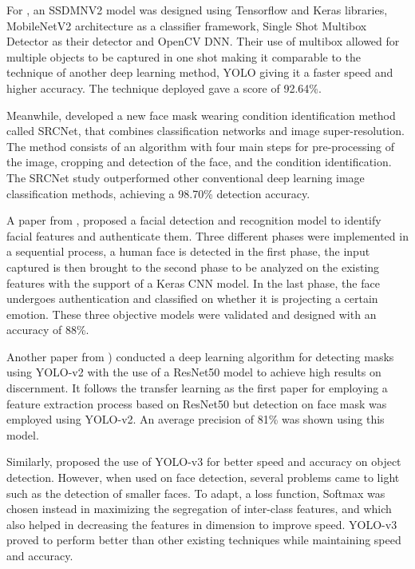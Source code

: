 \documentclass[a4paper,12pt]{article}
\begin{document}
For \cite{nagrath2021ssdmnv2}, an SSDMNV2 model was designed using Tensorflow and Keras libraries, MobileNetV2 architecture as a classifier framework, Single Shot Multibox Detector as their detector and OpenCV DNN. Their use of multibox allowed for multiple objects to be captured in one shot making it comparable to the technique of another deep learning method, YOLO giving it a faster speed and higher accuracy. The technique deployed gave a score of 92.64\%.

Meanwhile, \cite{qin2020identifying} developed a new face mask wearing condition identification method called SRCNet, that combines classification networks and image super-resolution. The method consists of an algorithm with four main steps for pre-processing of the image, cropping and detection of the face, and the condition identification. The SRCNet study outperformed other conventional deep learning image classification methods, achieving a 98.70\% detection accuracy.

A paper from \cite{hussain2020real}, proposed a facial detection and recognition model to identify facial features and authenticate them. Three different phases were implemented in a sequential process, a human face is detected in the first phase, the input captured is then brought to the second phase to be analyzed on the existing features with the support of a Keras CNN model. In the last phase, the face undergoes authentication and classified on whether it is projecting a certain emotion. These three objective models were validated and designed with an accuracy of 88\%.

Another paper from \cite{LOEY2021102600}) conducted a deep learning algorithm for detecting masks using YOLO-v2 with the use of a ResNet50 model to achieve high results on discernment. It follows the transfer learning as the first paper for employing a feature extraction process based on ResNet50 but detection on face mask was employed using YOLO-v2. An average precision of 81\% was shown using this model.

Similarly, \cite{li2020face} proposed the use of YOLO-v3 for better speed and accuracy on object detection. However, when used on face detection, several problems came to light such as the detection of smaller faces. To adapt, a loss function, Softmax was chosen instead in maximizing the segregation of inter-class features, and which also helped in decreasing the features in dimension to improve speed. YOLO-v3 proved to perform better than other existing techniques while maintaining speed and accuracy.
\end{document}
